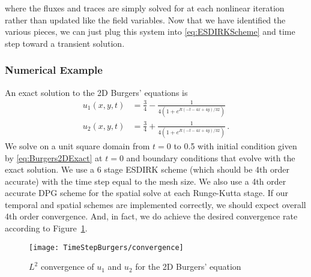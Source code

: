 \documentclass[Proposal.tex]{subfiles}
\begin{document}
where the fluxes and traces are simply solved for at each nonlinear iteration rather than updated like the field variables.
Now that we have identified the various pieces, we can just plug this system into \eqref{eq:ESDIRKScheme} and time step toward a transient solution.

\subsubsection{Numerical Example}
An exact solution to the 2D Burgers' equations is\cite{Burgers2D}
\begin{equation}
\label{eq:Burgers2DExact}
	\begin{aligned}
	u_1(x,y,t)&=\frac{3}{4}-\frac{1}{4(1+e^{R(-t-4x+4y)/32})}\\
	u_2(x,y,t)&=\frac{3}{4}+\frac{1}{4(1+e^{R(-t-4x+4y)/32})}\,.
	\end{aligned}
\end{equation}
We solve on a unit square domain from $t=0$ to 0.5 with initial condition given by \eqref{eq:Burgers2DExact} at $t=0$ and boundary conditions that evolve with the exact solution. 
We use a 6 stage ESDIRK scheme (which should be 4th order accurate) with the time step equal to the mesh size. 
We also use a 4th order accurate DPG scheme for the spatial solve at each Runge-Kutta stage. 
If our temporal and spatial schemes are implemented correctly, we should expect overall 4th order convergence.
And, in fact, we do achieve the desired convergence rate according to Figure~\ref{fig:Burgers2DConvergence}.

\begin{figure}[!ht]
	\centering
	\texttt{[image: TimeStepBurgers/convergence]}
	\caption{$L^2$ convergence of $u_1$ and $u_2$ for the 2D Burgers' equation}
	\label{fig:Burgers2DConvergence}
\end{figure}
\end{document}
